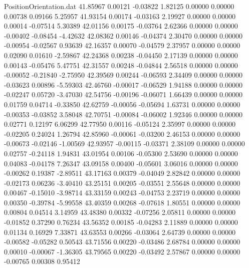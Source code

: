 \begin{filecontents}{PositionOrientation.dat}
  41.85967    0.00121   -0.03822     1.82125    0.00000    0.00000    0.00738    0.09166    5.25957
  41.93154    0.00174   -0.03163     2.19927    0.00000    0.00000    0.00014   -0.07514    5.30389
  42.01156    0.00175   -0.03764     2.62366    0.00000    0.00000   -0.00402   -0.08454   -4.42632
  42.08362    0.00146   -0.04374     2.30470    0.00000    0.00000   -0.00954   -0.02567    0.93639
  42.16357    0.00070   -0.04579     2.37957    0.00000    0.00000    0.02090    0.01610   -2.59867
  42.24368    0.00238   -0.04450     2.17139    0.00000    0.00000    0.00143   -0.05476    5.47751
  42.31557    0.00248   -0.04844     2.56518    0.00000    0.00000   -0.00052   -0.21840   -2.75950
  42.39569    0.00244   -0.06593     2.34409    0.00000    0.00000   -0.03623    0.00896   -5.59303
  42.46760   -0.00017   -0.06529     1.94188    0.00000    0.00000   -0.02247    0.05720   -3.47030
  42.54756   -0.00196   -0.06071     1.66439    0.00000    0.00000    0.01759    0.04714   -0.33850
  42.62759   -0.00056   -0.05694     1.63731    0.00000    0.00000   -0.00353   -0.03852    3.58048
  42.70751   -0.00084   -0.06002     1.92346    0.00000    0.00000    0.02771    0.12197    6.06299
  42.77950    0.00116   -0.05124     2.35997    0.00000    0.00000   -0.02205    0.24024    1.26794
  42.85960   -0.00061   -0.03200     2.46153    0.00000    0.00000   -0.00673   -0.02146   -1.00569
  42.93957   -0.00115   -0.03371     2.38109    0.00000    0.00000    0.02757   -0.24118    1.94831
  43.01954    0.00106   -0.05300     2.53690    0.00000    0.00000    0.04083   -0.04178    7.26347
  43.09158    0.00400   -0.05601     3.06016    0.00000    0.00000   -0.00262    0.19387   -2.89511
  43.17163    0.00379   -0.04049     2.82842    0.00000    0.00000   -0.02173    0.06236   -3.40410
  43.25151    0.00205   -0.03551     2.55648    0.00000    0.00000    0.00467   -0.15010   -3.98714
  43.33159    0.00243   -0.04753     2.23719    0.00000    0.00000    0.00350   -0.39784   -5.99558
  43.40359    0.00268   -0.07618     1.80551    0.00000    0.00000    0.00804    0.04514    3.14959
  43.48380    0.00332   -0.07256     2.05811    0.00000    0.00000   -0.01852    0.37290    0.76234
  43.56352    0.00185   -0.04283     2.11889    0.00000    0.00000    0.01134    0.16929    7.33871
  43.63553    0.00266   -0.03064     2.64739    0.00000    0.00000   -0.00582   -0.05282    0.50543
  43.71556    0.00220   -0.03486     2.68784    0.00000    0.00000    0.00010   -0.00067   -1.36305
  43.79565    0.00220   -0.03492     2.57867    0.00000    0.00000   -0.00765    0.00308    0.95412

\end{filecontents}
